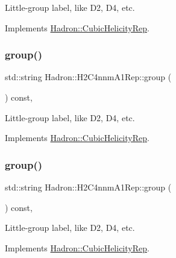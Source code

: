 Little-\/group label, like D2, D4, etc. 

Implements \mbox{\hyperlink{structHadron_1_1CubicHelicityRep_a101a7d76cd8ccdad0f272db44b766113}{Hadron\+::\+Cubic\+Helicity\+Rep}}.

\mbox{\label{structHadron_1_1H2C4nnmA1Rep_a857a824d79d2b5d7bf3b4e4641f171cb}} 
\subsubsection{\texorpdfstring{group()}{group()}\hspace{0.1cm}{\footnotesize\ttfamily [3/5]}}
{\footnotesize\ttfamily std\+::string Hadron\+::\+H2\+C4nnm\+A1\+Rep\+::group (\begin{DoxyParamCaption}{ }\end{DoxyParamCaption}) const\hspace{0.3cm}{\ttfamily [inline]}, {\ttfamily [virtual]}}

Little-\/group label, like D2, D4, etc. 

Implements \mbox{\hyperlink{structHadron_1_1CubicHelicityRep_a101a7d76cd8ccdad0f272db44b766113}{Hadron\+::\+Cubic\+Helicity\+Rep}}.

\mbox{\label{structHadron_1_1H2C4nnmA1Rep_a857a824d79d2b5d7bf3b4e4641f171cb}} 
\subsubsection{\texorpdfstring{group()}{group()}\hspace{0.1cm}{\footnotesize\ttfamily [4/5]}}
{\footnotesize\ttfamily std\+::string Hadron\+::\+H2\+C4nnm\+A1\+Rep\+::group (\begin{DoxyParamCaption}{ }\end{DoxyParamCaption}) const\hspace{0.3cm}{\ttfamily [inline]}, {\ttfamily [virtual]}}

Little-\/group label, like D2, D4, etc. 

Implements \mbox{\hyperlink{structHadron_1_1CubicHelicityRep_a101a7d76cd8ccdad0f272db44b766113}{Hadron\+::\+Cubic\+Helicity\+Rep}}.

